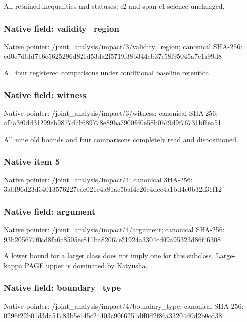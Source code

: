 \documentclass[10pt,a4paper]{article}
\begin{document}
\begingroup\raggedright\sloppy All retained inequalities and statuses;\allowbreak{} c2 and span c1 science unchanged.\par\endgroup

\subsubsection{Native field: validity\_\allowbreak{}region}
Native pointer: /joint\_\allowbreak{}analysis/impact/3/validity\_\allowbreak{}region; canonical SHA-256: ed0e7dbfd7b6e5625296d821d53da2f5719f38b344cb37c58f95045a7e1a99d8

\begingroup\raggedright\sloppy All four registered comparisons under conditional baseline retention.\par\endgroup

\subsubsection{Native field: witness}
Native pointer: /joint\_\allowbreak{}analysis/impact/3/witness; canonical SHA-256: af7a3f0dd31299eb9877d7b689778e89ba3900fd0e58b0b79d9f76731bf8ea51

\begingroup\raggedright\sloppy All nine old bounds and four comparisons completely read and dispositioned.\par\endgroup

\subsubsection{Native item 5}
Native pointer: /joint\_\allowbreak{}analysis/impact/4; canonical SHA-256: 3abf96d23d34013576227ede021e4a81ac5baf4c26e4dee4a1bd4e0b32d31f12

\subsubsection{Native field: argument}
Native pointer: /joint\_\allowbreak{}analysis/impact/4/argument; canonical SHA-256: 93b205677f0cd8fa6c8505ec811ba82067e21924a3304cd09a95323d86f46308

\begingroup\raggedright\sloppy A lower bound for a larger class does not imply one for this subclass. Large-kappa PAGE upper is dominated by Katyusha.\par\endgroup

\subsubsection{Native field: boundary\_\allowbreak{}type}
Native pointer: /joint\_\allowbreak{}analysis/impact/4/boundary\_\allowbreak{}type; canonical SHA-256: 0296f22b01d3da51783b5e145c24403c9066251dff0d2f86a33204d0d2b0cd38
\end{document}
